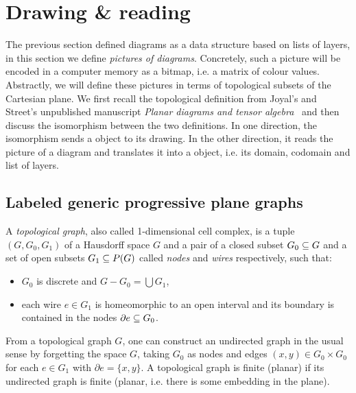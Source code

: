 
\section{Drawing \& reading} \label{section:drawing}

The previous section defined diagrams as a data structure based on lists of layers, in this section we define \emph{pictures of diagrams}.
Concretely, such a picture will be encoded in a computer memory as a bitmap, i.e. a matrix of colour values.
Abstractly, we will define these pictures in terms of topological subsets of the Cartesian plane.
We first recall the topological definition from Joyal's and Street's unpublished manuscript \emph{Planar diagrams and tensor algebra}~\cite{JoyalStreet88} and then discuss the isomorphism between the two definitions.
In one direction, the isomorphism sends a  object to its drawing.
In the other direction, it reads the picture of a diagram and translates it into a  object, i.e. its domain, codomain and list of layers.

\subsection{Labeled generic progressive plane graphs}

A \emph{topological graph}, also called 1-dimensional cell complex, is a tuple $(G, G_0, G_1)$ of a Hausdorff space $G$ and a pair of a closed subset $G_0 \subseteq G$ and a set of open subsets $G_1 \subseteq P(G)$ called \emph{nodes} and \emph{wires} respectively, such that:
\begin{itemize}
\item $G_0$ is discrete and $G - G_0 = \bigcup G_1$,
\item each wire $e \in G_1$ is homeomorphic to an open interval and its boundary is contained in the nodes $\partial e \subseteq G_0$.
\end{itemize}
From a topological graph $G$, one can construct an undirected graph in the usual sense by forgetting the space $G$, taking $G_0$ as nodes and edges $(x, y) \in G_0 \times G_0$ for each $e \in G_1$ with $\partial e = \{ x, y \}$.
A topological graph is finite (planar) if its undirected graph is finite (planar, i.e. there is some embedding in the plane).

